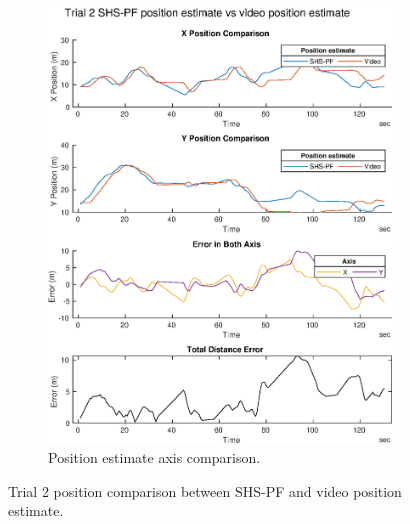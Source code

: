 \begin{figure}[H]
\begin{subfigure}[t]{.45\textwidth}
		\includegraphics[width=\linewidth]{images/20201129_1904_trial_2_traj_1}
		\caption{Position estimate axis comparison.}
		\label{fig:shspf_trial2_comparison}
	\end{subfigure}
	\caption{Trial 2 position comparison between SHS-PF and video position estimate.}
	\label{fig:shspf_trial2_shs_gt_comparison}
\end{figure}
 
